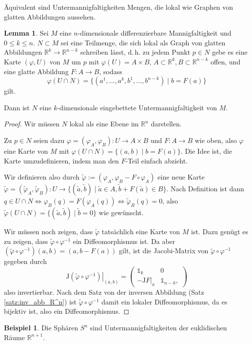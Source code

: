 \documentclass[a4paper]{scrbook}
\numberwithin{equation}{chapter}
\newcommand{\R}{\mathbb{R}}
\theoremstyle{definition}
\newtheorem{lemma}[defn]{Lemma}
\newtheorem{bsp}[defn]{Beispiel}
\begin{document}
Äquivalent sind Untermannigfaltigkeiten Mengen, die lokal wie Graphen von glatten Abbildungen aussehen.
\begin{lemma} \label{lemma:umf_lokal_graph}
	Sei $M$ eine $n$-dimensionale differenzierbare Mannigfaltigkeit und $0 \le k \le n$. $N\subset M$ sei eine Teilmenge, die sich lokal als Graph von glatten Abbildungen $\R^k \to \R^{n-k}$ schreiben lässt, d.\,h. zu jedem Punkt $p\in N$ gebe es eine Karte $(\varphi,U)$ von $M$ um $p$ mit $\varphi(U) = A \times B$, $A \subset \R^k, B \subset \R^{n-k}$ offen, und eine glatte Abbildung $F\colon A \to B$, sodass
	\[\varphi(U\cap N) = \{(a^1,\dots,a^k, b^1, \dots, b^{n-k}) \mid b = F(a)\}\]
	gilt.

	Dann ist $N$ eine $k$-dimensionale eingebettete Untermannigfaltigkeit von $M$.

	\begin{proof}
		Wir müssen $N$ lokal als eine Ebene im $\R^n$ darstellen.

		Zu $p \in N$ seien dazu $\varphi = (\varphi_A,\varphi_B)\colon U \to A\times B$ und $F\colon A\to B$ wie oben, also $\varphi$ eine Karte von $M$ mit $\varphi(U\cap N) = \{(a,b) \mid b = F(a)\}$. Die Idee ist, die Karte umzudefinieren, indem man den $F$-Teil einfach abzieht.

		Wir definieren also durch $\tilde\varphi := (\varphi_A, \varphi_B - F\circ\varphi_A)$ eine neue Karte $\tilde\varphi = (\tilde\varphi_A, \tilde\varphi_B) \colon U \to \{(\tilde a,\tilde b) \mid \tilde a \in A, \tilde b + F(\tilde a) \in B\}$. Nach Definition ist dann $q \in U\cap N \iff \varphi_B(q) = F(\varphi_A(q)) \iff \tilde\varphi_B(q) = 0$, also $\tilde\varphi(U\cap N) = \{(\tilde a,\tilde b) \mid \tilde b = 0\}$ wie gewünscht.

		Wir müssen noch zeigen, dass $\tilde\varphi$ tatsächlich eine Karte von $M$ ist. Dazu genügt es zu zeigen, dass $\tilde\varphi \circ \varphi^{-1}$ ein Diffeomorphismus ist. Da aber $(\tilde\varphi \circ \varphi^{-1})(a,b) = (a, b - F(a))$ gilt, ist die Jacobi-Matrix von $\tilde\varphi \circ \varphi^{-1}$ gegeben durch
		\[\left.\mathrm{J}(\tilde\varphi \circ \varphi^{-1})\right|_{(a,b)} = \begin{pmatrix}
			\mathds{1}_k & 0 \\
			- \left.\mathrm{J}F\right|_a & \mathds{1}_{n-k},
		\end{pmatrix}\]
		also invertierbar. Nach dem Satz von der inversen Abbildung (Satz \ref{satz:inv_abb_R^n}) ist $\tilde\varphi \circ \varphi^{-1}$ damit ein lokaler Diffeomorphismus, da es bijektiv ist, also ein Diffeomorphismus.
	\end{proof}
\end{lemma}
\begin{bsp}
	Die Sphären $S^n$ sind Untermannigfaltigkeiten der euklidischen Räume $\R^{n+1}$.
\end{bsp}
\end{document}
